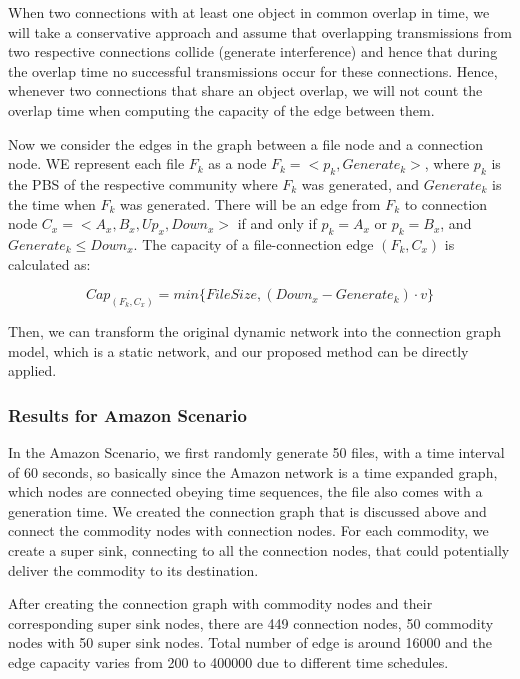 \documentclass[conference]{IEEEtran}
\begin{document}
When two connections with at least one object in common overlap in time, we will take a conservative approach and assume that overlapping transmissions from  two respective connections collide (generate interference) and hence that during the overlap time no successful transmissions occur for these connections. Hence, whenever two connections that share an object overlap, we will not count the overlap time when computing the capacity of the edge between them.

Now we consider the edges in the graph between a file node and a connection node. WE represent each file $F_k$ as a node $F_k=<p_k,Generate_k>$, where $p_k$ is the PBS of the respective community where $F_k$ was generated, and $Generate_k$ is the time when $F_k$  was generated. There will be an edge from $F_k$ to connection node $C_x=<A_x, B_x, Up_x, Down_x>$ if and only if $p_k = A_x$ or $p_k = B_x$, and $Generate_k \leq Down_x$. The capacity of a file-connection edge $(F_k,C_x)$ is calculated as:

\begin{equation} \nonumber
Cap_{(F_k,C_x)} = min \{FileSize, (Down_x-Generate_k )\cdot v\}
\end{equation}


Then, we can transform the original dynamic network into the connection graph model, which is a static network, and our proposed method can be directly applied.


\subsubsection{Results for Amazon Scenario}

In the Amazon Scenario, we first randomly generate 50 files, with a time interval of 60 seconds, so basically since the Amazon network is a time expanded graph, which nodes are connected obeying time sequences, the file also comes with a generation time. We created the connection graph that is discussed above and connect the commodity nodes with connection nodes. For each commodity, we create a super sink, connecting to all the connection nodes, that could potentially deliver the commodity to its destination. 

After creating the connection graph with commodity nodes and their corresponding super sink nodes, there are 449 connection nodes, 50 commodity nodes with 50 super sink nodes. Total number of edge is around 16000 and the edge capacity varies from 200 to 400000 due to different time schedules. 
\end{document}
